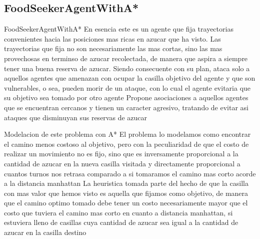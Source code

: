 \documentclass{beamer}
\begin{document}
\subsection{FoodSeekerAgentWithA*}
\begin{frame}{FoodSeekerAgentWithA*}
    En esencia este es un agente que fija trayectorias convenientes hacia las posiciones mas ricas en azucar que ha visto. Las trayectorias que fija no son necesariamente las mas cortas, sino las mas provechosas en terminso de azucar recolectada, de manera que aspira a siempre tener una buena reserva de azucar.
    Siendo consecuente con su plan, ataca solo a aquellos agentes que amenazan con ocupar la casilla objetivo del agente y que son vulnerables, o sea, pueden morir de un ataque, con lo cual el agente evitaria que su objetivo sea tomado por otro agente
    Propone asociaciones a aquellos agentes que se encuentran cercanos y tienen un caracter agresivo, tratando de evitar asi ataques que disminuyan sus reservas de azucar
\end{frame}

\begin{frame}{Modelacion de este problema con A*}
    El problema lo modelamos como encontrar el camino menos costoso al objetivo, pero con la peculiaridad de que el costo de realizar un movimiento no es fijo, sino que es inversamente proporcional a la cantidad de azucar en la nueva casilla visitada y directamente proporcional a cuantos turnos nos retrasa comparado a si tomaramos el camino mas corto acorde a la distancia manhattan
    La heuristica tomada parte del hecho de que la casilla con mas valor que hemos visto es aquella que fijamos como objetivo, de manera que el camino optimo tomado debe tener un costo necesariamente mayor que el costo que tuviera el camino mas corto en cuanto a distancia manhattan, si estuviera lleno de casillas cuya cantidad de azucar sea igual a la cantidad de azucar en la casilla destino
\end{frame}
\end{document}
